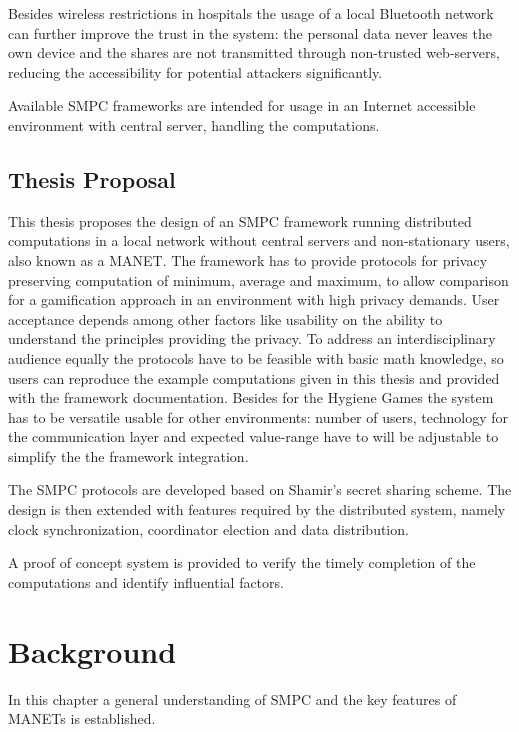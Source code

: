 Besides wireless restrictions in hospitals the usage of a local Bluetooth network can further improve the trust in the system: the personal data never leaves the own device and the shares are not transmitted through non-trusted web-servers, reducing the accessibility for potential attackers significantly.

Available \gls{SMPC} frameworks are intended for usage in an Internet accessible environment with central server, handling the computations.

\section{Thesis Proposal}

This thesis proposes the design of an \gls{SMPC} framework running distributed computations in a local network without central servers and non-stationary users, also known as a \gls{MANET}. The framework has to provide protocols for privacy preserving computation of minimum, average and maximum, to allow comparison for a gamification approach in an environment with high privacy demands. User acceptance depends among other factors like usability on the ability to understand the principles providing the privacy. To address an interdisciplinary audience equally the protocols have to be feasible with basic math knowledge, so users can reproduce the example computations given in this thesis and provided with the framework documentation. Besides for the Hygiene Games the system has to be versatile usable for other environments: number of users, technology for the communication layer and expected value-range have to will be adjustable to simplify the the framework integration.

The \gls{SMPC} protocols are developed based on Shamir's secret sharing scheme. The design is then extended with features required by the distributed system, namely clock synchronization, coordinator election and data distribution.

A proof of concept system is provided to verify the timely completion of the computations and identify influential factors.

\FloatBarrier

\chapter{Background} \label{Background}

In this chapter a general understanding of \gls{SMPC} and the key features of \glspl{MANET} is established.  

